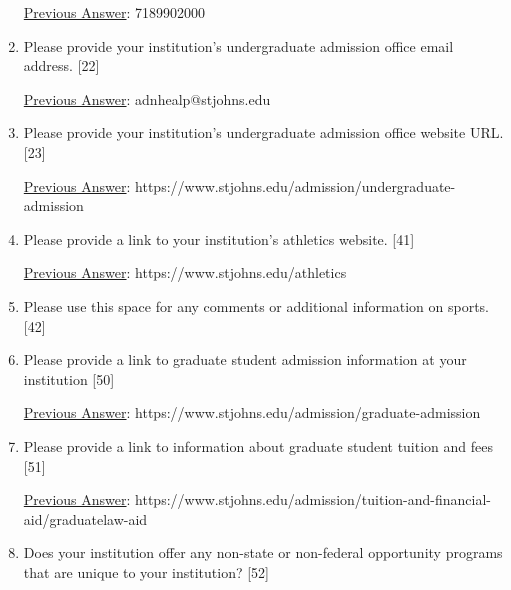 \documentclass[12 pt, a4paper]{article}
\begin{document}
\begin{Form}
\begin{enumerate}
\underline{Previous Answer}: 7189902000\medskip

\TextField[width = 6 in,multiline, name=90024]{} \medskip

\item Please provide your institution's undergraduate admission office email address. [22] \medskip

\underline{Previous Answer}: adnhealp@stjohns.edu\medskip

\TextField[width = 6 in,multiline, name=90025]{} \medskip

\item Please provide your institution's undergraduate admission office website URL. [23] \medskip

\underline{Previous Answer}: https://www.stjohns.edu/admission/undergraduate-admission\medskip

\TextField[width = 6 in,multiline, name=90026]{} \medskip

\item Please provide a link to your institution's athletics website. [41] \medskip

\underline{Previous Answer}: https://www.stjohns.edu/athletics\medskip

\TextField[width = 6 in,multiline, name=90103]{} \medskip

\item Please use this space for any comments or additional information on sports. [42] \medskip

\TextField[width = 6 in,multiline, name=90104]{} \medskip

\item Please provide a link to graduate student admission information at your institution [50] \medskip

\underline{Previous Answer}: https://www.stjohns.edu/admission/graduate-admission\medskip

\TextField[width = 6 in,multiline, name=90111]{} \medskip

\item Please provide a link to information about graduate student tuition and fees [51] \medskip

\underline{Previous Answer}: https://www.stjohns.edu/admission/tuition-and-financial-aid/graduatelaw-aid\medskip

\TextField[width = 6 in,multiline, name=90112]{} \medskip

\item Does your institution offer any non-state or non-federal opportunity programs that are unique to your institution? [52] \medskip


\end{enumerate}
\end{Form}
\end{document}
